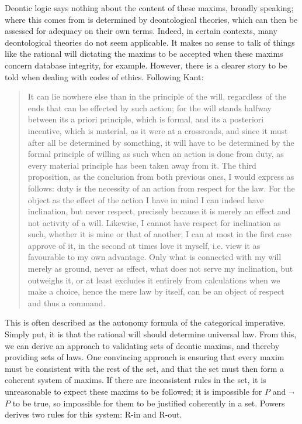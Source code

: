\documentclass{l4proj}
\begin{document}
Deontic logic says nothing about the content of these maxims, broadly speaking; where this comes from is determined by deontological theories, which can then be assessed for adequacy on their own terms. Indeed, in certain contexts, many deontological theories do not seem applicable. It makes no sense to talk of things like the rational will dictating the maxims to be accepted when these maxims concern database integrity, for example. However, there is a clearer story to be told when dealing with codes of ethics. Following Kant\cite{groundwork}: 

\blockquote{It can lie nowhere else than in the principle of the will, regardless of the ends that can be effected by such action; for the will stands halfway between its a priori principle, which is formal, and its a posteriori incentive, which is material, as it were at a crossroads, and since it must after all be determined by something, it will have to be determined by the formal principle of willing as such when an action is done from duty, as every material principle has been taken away from it. The third proposition, as the conclusion from both previous ones, I would express as follows: duty is the necessity of an action from respect for the law. For the object as the effect of the action I have in mind I can indeed have inclination, but never respect, precisely because it is merely an effect and not activity of a will. Likewise, I cannot have respect for inclination as such, whether it is mine or that of another; I can at most in the first case approve of it, in the second at times love it myself, i.e. view it as favourable to my own advantage. Only what is connected with my will merely as ground, never as effect, what does not serve my inclination, but outweighs it, or at least excludes it entirely from calculations when we make a choice, hence the mere law by itself, can be an object of respect and thus a command.}

This is often described as the autonomy formula of the categorical imperative. Simply put, it is that the rational will should determine universal law. From this, we can derive an approach to validating sets of deontic maxims, and thereby providing sets of laws. One convincing approach is ensuring that every maxim must be consistent with the rest of the set, and that the set must then form a coherent system of maxims\cite{Powers}. If there are inconsistent rules in the set, it is unreasonable to expect these maxims to be followed; it is impossible for $P$ and \( \neg \) $P$ to be true, so impossible for them to be justified coherently in a set. Powers derives two rules for this system: R-in and R-out. 
\end{document}
